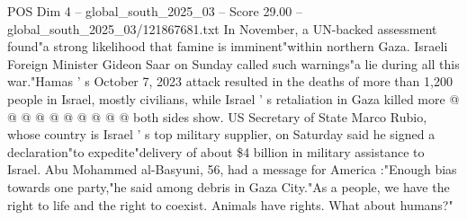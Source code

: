 \begin{textsample}{POS Dim 4 – global\_south\_2025\_03 – Score 29.00 – global\_south\_2025\_03/121867681.txt}
In November, a UN-backed assessment found"a strong likelihood that famine is imminent"within northern Gaza.
Israeli Foreign Minister Gideon Saar on Sunday called such warnings"a lie during all this war."Hamas ' s October 7, 2023 attack resulted in the deaths of more than 1,200 people in Israel, mostly civilians, while Israel ' s retaliation in Gaza killed more @ @ @ @ @ @ @ @ @ @ both sides show.
US Secretary of State Marco Rubio, whose country is Israel ' s top military supplier, on Saturday said he signed a declaration"to expedite"delivery of about \$4 billion in military assistance to Israel.
Abu Mohammed al-Basyuni, 56, had a message for America :"Enough bias towards one party,"he said among debris in Gaza City."As a people, we have the right to life and the right to coexist.
Animals have rights.
What about humans?"

\end{textsample}
